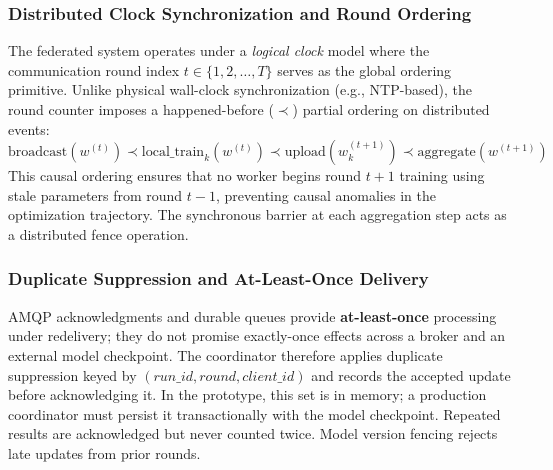 \documentclass[applsci,article,submit,oneauthor,pdftex]{Definitions/mdpi}
\begin{document}
\subsubsection{Distributed Clock Synchronization and Round Ordering}
The federated system operates under a \textit{logical clock} model where the communication round index $t \in \{1, 2, \dots, T\}$ serves as the global ordering primitive. Unlike physical wall-clock synchronization (e.g., NTP-based), the round counter imposes a happened-before ($\prec$) partial ordering on distributed events:
\begin{equation}
\text{broadcast}(w^{(t)}) \prec \text{local\_train}_k(w^{(t)}) \prec \text{upload}(w_k^{(t+1)}) \prec \text{aggregate}(w^{(t+1)})
\end{equation}
This causal ordering ensures that no worker begins round $t+1$ training using stale parameters from round $t-1$, preventing causal anomalies in the optimization trajectory. The synchronous barrier at each aggregation step acts as a distributed fence operation.

\subsubsection{Duplicate Suppression and At-Least-Once Delivery}
AMQP acknowledgments and durable queues provide \textbf{at-least-once} processing under redelivery; they do not promise exactly-once effects across a broker and an external model checkpoint. The coordinator therefore applies duplicate suppression keyed by $(run\_id, round, client\_id)$ and records the accepted update before acknowledging it. In the prototype, this set is in memory; a production coordinator must persist it transactionally with the model checkpoint. Repeated results are acknowledged but never counted twice. Model version fencing rejects late updates from prior rounds.
\end{document}
